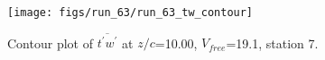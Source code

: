 \begin{figure}[H]
\centering
\texttt{[image: figs/run\_63/run\_63\_tw\_contour]}
\caption{Contour plot of $\overline{t^\prime w^\prime}$ at $z/c$=10.00, $V_{free}$=19.1, station 7.}
\end{figure}


